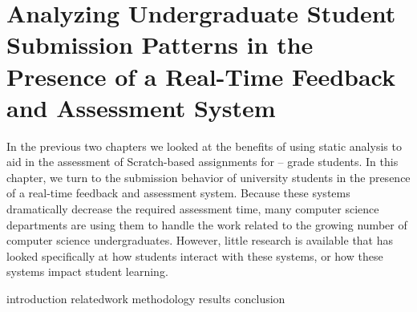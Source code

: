 \chapter{Analyzing Undergraduate Student Submission Patterns in the Presence of
  a Real-Time Feedback and Assessment System}
\label{chap:feedback}

\def\currentprefix{feedback}

In the previous two chapters we looked at the benefits of using static analysis
to aid in the assessment of Scratch-based assignments for --
grade students. In this chapter, we turn to the submission behavior of
university students in the presence of a real-time feedback and assessment
system. Because these systems dramatically decrease the required assessment
time, many computer science departments are using them to handle the work
related to the growing number of computer science undergraduates. However,
little research is available that has looked specifically at how students
interact with these systems, or how these systems impact student learning.

\iffull
{introduction}
{relatedwork}
{methodology}
{results}
{conclusion}
\fi
